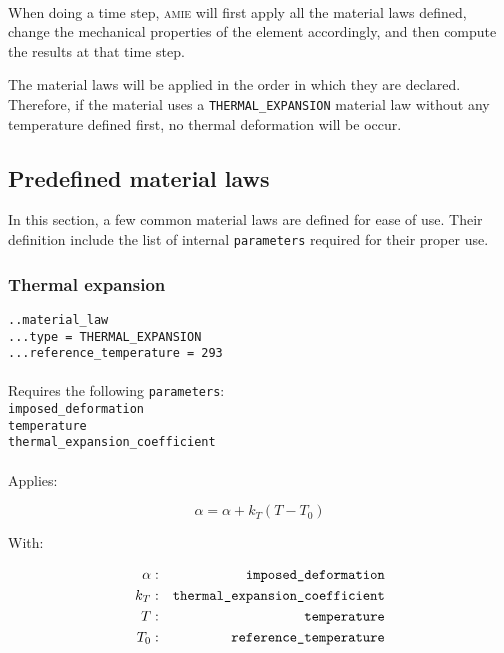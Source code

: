 \documentclass[10pt]{article}
\begin{document}
\paragraph{} When doing a time step, \textsc{amie} will first apply all the material laws defined, change the mechanical properties of the element accordingly, and then compute the results at that time step.

The material laws will be applied in the order in which they are declared. Therefore, if the material uses a \verb+THERMAL_EXPANSION+ material law without any temperature defined first, no thermal deformation will be occur.

\subsection{Predefined material laws}

In this section, a few common material laws are defined for ease of use. Their definition include the list of internal \verb+parameters+ required for their proper use.

\subsubsection{Thermal expansion}

\noindent \verb+..material_law+\\
\verb+...type = THERMAL_EXPANSION+\\
\verb+...reference_temperature = 293+

\paragraph{}Requires the following \verb+parameters+:\\

\noindent \verb+imposed_deformation+\\
\verb+temperature+\\
\verb+thermal_expansion_coefficient+

\paragraph{}Applies:

\begin{equation}
	\alpha = \alpha + k_T ( T - T_0 )
\end{equation}

With:

\begin{eqnarray}
	\alpha & : & \verb+imposed_deformation+ \notag \\
	k_T & : & \verb+thermal_expansion_coefficient+\notag  \\
	T & : & \verb+temperature+ \notag \\
	T_0 & : & \verb+reference_temperature+ \notag 
\end{eqnarray}
\end{document}
